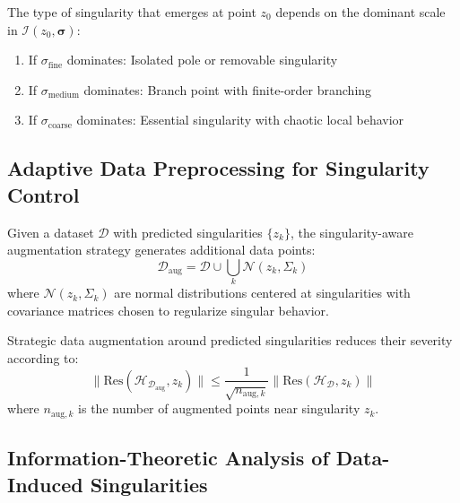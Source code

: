 \begin{definition}
\begin{enumerate}
\begin{theorem}
The type of singularity that emerges at point $z_0$ depends on the dominant scale in $\mathcal{I}(z_0, \boldsymbol{\sigma})$:
\begin{enumerate}
\item If $\sigma_{\text{fine}}$ dominates: Isolated pole or removable singularity
\item If $\sigma_{\text{medium}}$ dominates: Branch point with finite-order branching
\item If $\sigma_{\text{coarse}}$ dominates: Essential singularity with chaotic local behavior
\end{enumerate}
\end{theorem}

\subsection{Adaptive Data Preprocessing for Singularity Control}

\begin{definition}
Given a dataset $\mathcal{D}$ with predicted singularities $\{z_k\}$, the singularity-aware augmentation strategy generates additional data points:
\begin{equation}
\mathcal{D}_{\text{aug}} = \mathcal{D} \cup \bigcup_{k} \mathcal{N}(z_k, \Sigma_k)
\end{equation}
where $\mathcal{N}(z_k, \Sigma_k)$ are normal distributions centered at singularities with covariance matrices chosen to regularize singular behavior.
\end{definition}

\begin{theorem}
Strategic data augmentation around predicted singularities reduces their severity according to:
\begin{equation}
\|\text{Res}(\mathcal{H}_{\mathcal{D}_{\text{aug}}}, z_k)\| \leq \frac{1}{\sqrt{n_{\text{aug}, k}}} \|\text{Res}(\mathcal{H}_{\mathcal{D}}, z_k)\|
\end{equation}
where $n_{\text{aug}, k}$ is the number of augmented points near singularity $z_k$.
\end{theorem}

\subsection{Information-Theoretic Analysis of Data-Induced Singularities}


\end{enumerate}
\end{definition}
